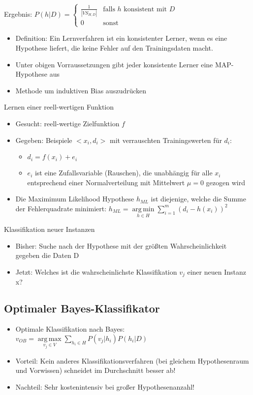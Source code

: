 \documentclass[paper=a4, fontsize=11pt]{scrartcl} %
\numberwithin{equation}{section} %
\numberwithin{figure}{section} %
\numberwithin{table}{section} %
\DeclareMathOperator*{\argmax}{arg\,max}
\DeclareMathOperator*{\argmin}{arg\,min}
\begin{document}
Ergebnis: $P(h|D) = \left\{\begin{array}{cl} \frac{1}{|VS_{H,D}|} & \mbox{falls }h \mbox{ konsistent mit } D\\ 0 & \mbox{sonst} \end{array}\right.$

\begin{itemize}
\item Definition: Ein Lernverfahren ist ein konsistenter Lerner, wenn es eine Hypothese liefert, die keine Fehler auf den Trainingsdaten macht.
\item Unter obigen Vorraussetzungen gibt jeder konsistente Lerner eine MAP-Hypothese aus
\item Methode um induktiven Bias auszudrücken
\end{itemize}

Lernen einer reell-wertigen Funktion
\begin{itemize}
\item Gesucht: reell-wertige Zielfunktion $f$
\item Gegeben: Beispiele $<x_i,d_i>$ mit verrauschten Trainingswerten für $d_i$:
\begin{itemize}
\item $d_i = f(x_i) + e_i$
\item $e_i$ ist eine Zufallsvariable (Rauschen), die unabhängig für alle $x_i$ entsprechend einer Normalverteilung mit Mittelwert $\mu = 0$ gezogen wird
\end{itemize}
\item Die Maximimum Likelihood Hypothese $h_{ML}$ ist diejenige, welche die Summe der Fehlerquadrate minimiert: $h_{ML} = \argmin\limits_{h \in H} \sum\limits_{i=1}^m (d_i - h(x_i))^2$
\end{itemize}

Klassifikation neuer Instanzen
\begin{itemize}
\item Bisher: Suche nach der Hypothese mit der größten Wahrscheinlichkeit gegeben die Daten D
\item Jetzt: Welches ist die wahrscheinlichste Klassifikation $v_j$ einer neuen Instanz x?
\end{itemize}

\subsection{Optimaler Bayes-Klassifikator}

\begin{itemize}
\item Optimale Klassifikation nach Bayes: $v_{OB} = \argmax\limits_{v_j \in V} \sum\limits_{h_i \in H} P(v_j|h_i) P(h_i|D)$
\item Vorteil: Kein anderes Klassifikationsverfahren (bei gleichem Hypothesenraum und Vorwissen) schneidet im Durchschnitt besser ab!
\item Nachteil: Sehr kostenintensiv bei großer Hypothesenanzahl!
\end{itemize}
\end{document}
